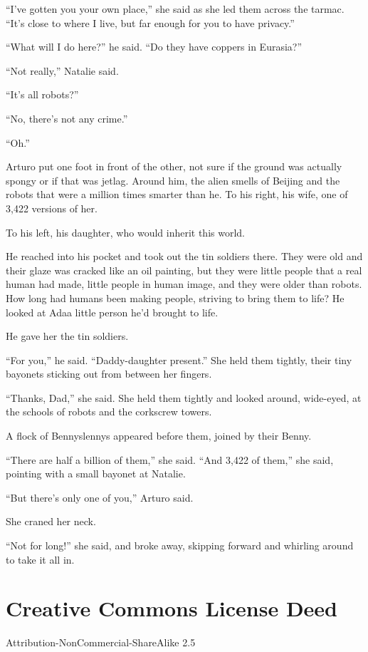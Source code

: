 “I’ve gotten you your own place,” she said as she led them across
the tarmac. “It’s close to where I live, but far enough for you to
have privacy.”

“What will I do here?” he said. “Do they have coppers in Eurasia?”

“Not really,” Natalie said.

“It’s all robots?”

“No, there’s not any crime.”

“Oh.”

Arturo put one foot in front of the other, not sure if the ground
was actually spongy or if that was jetlag. Around him, the alien
smells of Beijing and the robots that were a million times smarter
than he. To his right, his wife, one of 3,422 versions of her.

To his left, his daughter, who would inherit this world.

He reached into his pocket and took out the tin soldiers there.
They were old and their glaze was cracked like an oil painting, but
they were little people that a real human had made, little people
in human image, and they were older than robots. How long had
humans been making people, striving to bring them to life? He
looked at Ada{\dash}a little person he’d brought to life.

He gave her the tin soldiers.

“For you,” he said. “Daddy-daughter present.” She held them
tightly, their tiny bayonets sticking out from between her
fingers.

“Thanks, Dad,” she said. She held them tightly and looked around,
wide-eyed, at the schools of robots and the corkscrew towers.

A flock of Bennyslennys appeared before them, joined by their
Benny.

“There are half a billion of them,” she said. “And 3,422 of them,”
she said, pointing with a small bayonet at Natalie.

“But there’s only one of you,” Arturo said.

She craned her neck.

“Not for long!” she said, and broke away, skipping forward and
whirling around to take it all in.


\section{Creative Commons License Deed}

Attribution-NonCommercial-ShareAlike 2.5

